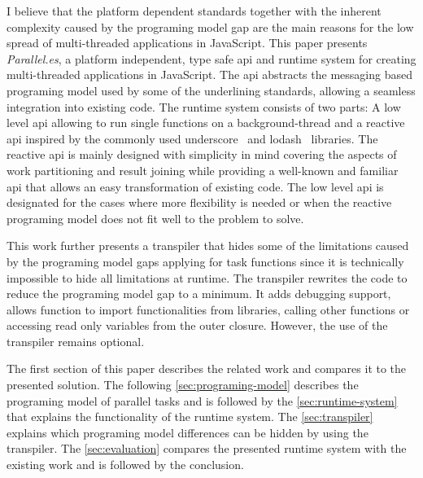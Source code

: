 I believe that the platform dependent standards together with the inherent complexity caused by the programing model gap are the main reasons for the low spread of multi-threaded applications in JavaScript. This paper presents \textit{Parallel.es}, a platform independent, type safe api and runtime system for creating multi-threaded applications in JavaScript. The api abstracts the messaging based programing model used by some of the underlining standards, allowing a seamless integration into existing code. The runtime system consists of two parts: A low level api allowing to run single functions on a background-thread and a reactive api inspired by the commonly used underscore~\cite{underscorejs} and lodash~\cite{lodash} libraries. The reactive api is mainly designed with simplicity in mind covering the aspects of work partitioning and result joining while providing a well-known and familiar api that allows an easy transformation of existing code. The low level api is designated for the cases where more flexibility is needed or when the reactive programing model does not fit well to the problem to solve. 

This work further presents a transpiler that hides some of the limitations caused by the programing model gaps applying for task functions since it is technically impossible to hide all limitations at runtime. The transpiler rewrites the code to reduce the programing model gap to a minimum. It adds debugging support, allows function to import functionalities from libraries, calling other functions or accessing read only variables from the outer closure. However, the use of the transpiler remains optional. 


The first section of this paper describes the related work and compares it to the presented solution. The following \cref{sec:programing-model} describes the programing model of parallel tasks and is followed by the \cref{sec:runtime-system} that explains the functionality of the runtime system. The \cref{sec:transpiler} explains which programing model differences can be hidden by using the transpiler. The \cref{sec:evaluation} compares the presented runtime system with the existing work and is followed by the conclusion. 
